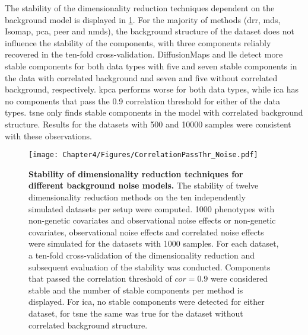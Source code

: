 The stability of the dimensionality reduction techniques dependent on the background model is displayed in \cref{fig:cor-noise}. For the majority of methods (\gls{drr}, \gls{mds}, Isomap, \gls{pca}, \gls{peer} and \gls{nmds}), the background structure of the dataset does not influence the stability of the components, with three components reliably recovered in the ten-fold cross-validation. DiffusionMaps and \gls{lle} detect more stable components for both data types with five and seven stable components in the data with correlated background and seven and five without correlated background, respectively. \gls{kpca} performs worse for both data types, while \gls{ica} has no components that pass the \num{0.9} correlation threshold for either of the data types. \gls{tsne} only finds stable components in the model with correlated background structure.  Results for the datasets with \num{500} and \num{10000} samples were consistent with these observations.

\begin{figure}[hbtp]
	\centering
	\texttt{[image: Chapter4/Figures/CorrelationPassThr\_Noise.pdf]}
	\caption[\textbf{Stability of dimensionality reduction techniques for different background noise models.}]{\textbf{Stability of dimensionality reduction techniques for different background noise models. }The stability of twelve dimensionality reduction methods on the ten independently simulated datasets per setup were computed. \num{1000} phenotypes with non-genetic covariates and observational noise effects or non-genetic covariates, observational noise effects and correlated noise effects were simulated for the datasets with \numlist{1000} samples. For each dataset, a ten-fold cross-validation of the dimensionality reduction and subsequent evaluation of the stability was conducted. Components that passed the correlation threshold of \(cor=0.9\) were considered stable and the number of stable components per method is displayed. For \gls{ica}, no stable components were detected for either dataset, for \gls{tsne} the same was true for the dataset without correlated background structure.} 
	 	\label{fig:cor-noise}
\end{figure}

